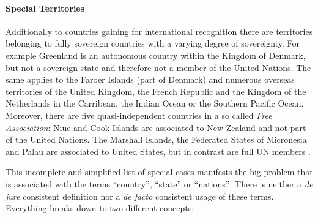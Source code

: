 
\paragraph{Special Territories} %
\label{par:special_territories}

Additionally to countries gaining for international recognition there are territories belonging to fully sovereign countries with a varying degree of sovereignty. For example Greenland is an autonomous country within the Kingdom of Denmark, but not a  sovereign state and therefore not a member of the United Nations. The same applies to the Faroer Islands (part of Denmark) and numerous overseas territories of the United Kingdom, the French Republic and the Kingdom of the Netherlands in the Carribean, the Indian Ocean or the Southern Pacific Ocean. Moreover, there are five quasi-independent countries in a so called \emph{Free Association}: Niue and Cook Islands are associated to New Zealand and not part of the United Nations. The Marshall Islands, the Federated States of Micronesia and Palau are associated to United States, but in contrast are full UN members \cite{SpecialTerritories}.




This incomplete and simplified list of special cases manifests the big problem that is associated with the terms ``country'', ``state'' or ``nations'': There is neither a \emph{de jure} consistent definition nor a \emph{de facto} consistent usage of these terms. Everything breaks down to two different concepts:



